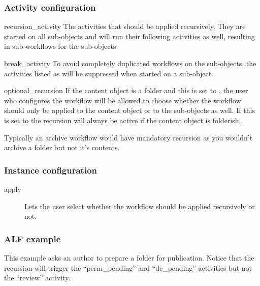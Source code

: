 \subsubsection{Activity configuration}

\begin{memberdesc}{recursion\_activity}
    The activities that should be applied recursively. They are started on all sub-objects
    and will run their following activities as well, resulting in sub-workflows for the sub-objects.
\end{memberdesc}
\begin{memberdesc}{break\_activity}
    To avoid completely duplicated workflows on the sub-objects, the activities listed as 
    will be suppressed when started on a sub-object.
\end{memberdesc}
\begin{memberdesc}{optional\_recursion}
    If the content object is a folder and this is set to , the user who configures the
    workflow will be allowed to choose whether the workflow should only be applied to the
    content object or to the sub-objects as well.
    If this is set to  the recursion will always be active if the content object
    is folderish.

    Typically an archive workflow would have mandatory recursion as you wouldn't archive a folder
    but not it's contents.
\end{memberdesc}

\subsubsection{Instance configuration}

    \begin{description}
        \item[apply] Lets the user select whether the workflow should be applied 
            recursively or not.
    \end{description}

\subsubsection{ALF example}

This example asks an author to prepare a folder for publication. Notice that
the recursion will trigger the ``perm\_pending'' and ``dc\_pending'' activities
but not the ``review'' activity.

